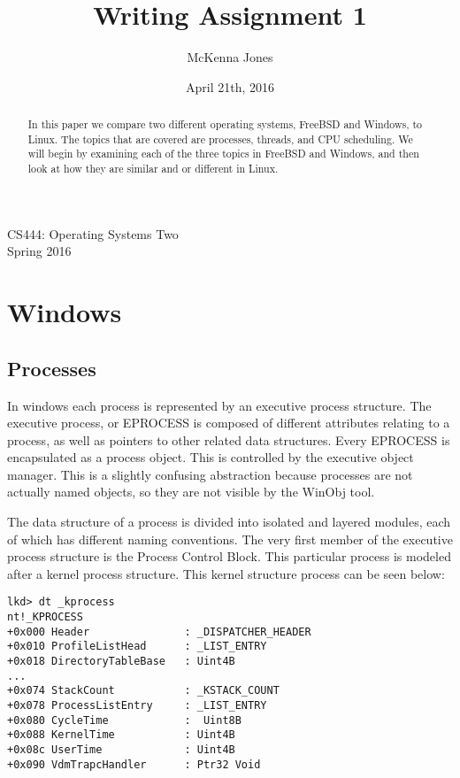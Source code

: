 \documentclass[letterpaper,10pt,titlepage,draftclsnofoot,onecolumn]{IEEEtran}
\title{Writing Assignment 1}
\author{McKenna Jones}
\date{April 21th, 2016}
\begin{document}
\begin{titlepage}

\maketitle
\begin{center}
CS444: Operating Systems Two \\
Spring 2016
\vspace{50 mm}
\end{center}
\begin{abstract}
In this paper we compare two different operating systems, FreeBSD and Windows, to Linux. The topics that are covered are processes, threads, and CPU scheduling. We will begin by examining each of the three topics in FreeBSD and Windows, and then look at how they are similar and or different in Linux.  
\end{abstract}
\end{titlepage}
\section{Windows}
\subsection{Processes}
In windows each process is represented by an executive process structure. The executive process, or EPROCESS is composed of different attributes relating to a process, as well as pointers to other related data structures. Every EPROCESS is encapsulated as a process object. This is controlled by the executive object manager. This is a slightly confusing abstraction because processes are not actually named objects, so they are not visible by the WinObj tool. \cite{windows}

The data structure of a process is divided into isolated and layered modules, each of which has different naming conventions. The very first member of the executive process structure is the Process Control Block. This particular process is modeled after a kernel process structure. This kernel structure process can be seen below: 
\begin{lstlisting}
lkd> dt _kprocess
nt!_KPROCESS
+0x000 Header				: _DISPATCHER_HEADER
+0x010 ProfileListHead 		: _LIST_ENTRY
+0x018 DirectoryTableBase	: Uint4B
...
+0x074 StackCount			: _KSTACK_COUNT
+0x078 ProcessListEntry 	: _LIST_ENTRY
+0x080 CycleTime			:  Uint8B
+0x088 KernelTime			: Uint4B
+0x08c UserTime				: Uint4B
+0x090 VdmTrapcHandler		: Ptr32 Void
\end{lstlisting}
\end{document}
